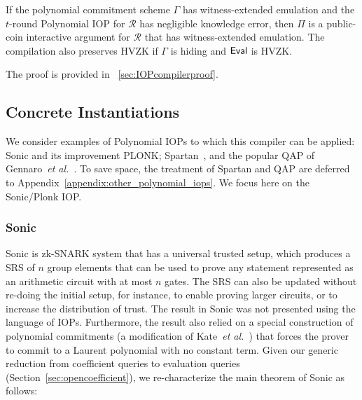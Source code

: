 \begin{theorem}\label{thm:IOPcompiler}
If the polynomial commitment scheme $\Gamma$ has witness-extended emulation and the $t$-round Polynomial IOP for $\mathcal{R}$ has negligible knowledge error, then $\Pi$ is a public-coin interactive argument for $\mathcal{R}$ that has witness-extended emulation. The compilation also preserves HVZK if $\Gamma$ is hiding and $\textsf{{Eval}}$ is HVZK. 
\end{theorem}

The proof is provided in \appendixphrase~\ref{sec:IOPcompilerproof}.


\subsection{Concrete Instantiations} 
We consider examples of Polynomial IOPs to which this compiler can be applied: \textsf{Sonic} and its improvement \textsf{PLONK}; \textsf{Spartan}~\cite{Spartan}, and the popular QAP of Gennaro~\emph{et al.}~\cite{EC:GGPR13}. 
\ifappendix
To save space, the treatment of \textsf{Spartan} and QAP are deferred to Appendix~\ref{appendix:other_polynomial_iops}. We focus here on the \textsf{Sonic}/\textsf{Plonk} IOP.
\fi

\subsubsection{Sonic} 
\textsf{Sonic} is zk-SNARK system that has a universal trusted setup, which produces a SRS of $n$ group elements that can be used to prove any statement represented as an arithmetic circuit with at most $n$ gates. The SRS can also be updated without re-doing the initial setup, for instance, to enable proving larger circuits, or to increase the distribution of trust. The result in \textsf{Sonic} was not presented using the language of IOPs. Furthermore, the result also relied on a special construction of polynomial commitments (a modification of Kate~\emph{et al.}~\cite{AC:KatZavGol10}) that forces the prover to commit to a Laurent polynomial with no constant term. Given our generic reduction from coefficient queries to evaluation queries (Section~\ref{sec:opencoefficient}), we re-characterize the main theorem of \textsf{Sonic} as follows: 

